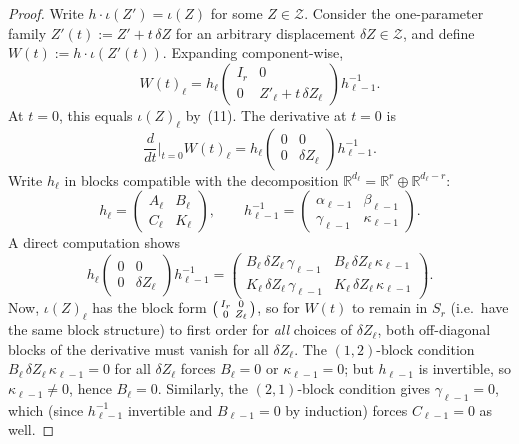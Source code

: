 \documentclass{article}
\theoremstyle{definition}
\begin{document}
\begin{proof}
Write $h \cdot \iota(Z') = \iota(Z)$ for some $Z \in \mathcal{Z}$. Consider the one-parameter family $Z'(t) := Z' + t\,\delta Z$ for an arbitrary displacement $\delta Z \in \mathcal{Z}$, and define $W(t) := h \cdot \iota(Z'(t))$.  Expanding component-wise,
\[
W(t)_\ell = h_\ell \begin{pmatrix} I_r & 0 \\ 0 & Z'_\ell + t\,\delta Z_\ell \end{pmatrix} h_{\ell-1}^{-1}.
\]
At $t = 0$, this equals $\iota(Z)_\ell$ by~(11).  The derivative at $t = 0$ is
\[
\frac{d}{dt}\Big|_{t=0} W(t)_\ell = h_\ell \begin{pmatrix} 0 & 0 \\ 0 & \delta Z_\ell \end{pmatrix} h_{\ell-1}^{-1}.
\]
Write $h_\ell$ in blocks compatible with the decomposition $\mathbb{R}^{d_\ell} = \mathbb{R}^r \oplus \mathbb{R}^{d_\ell - r}$:
\[
h_\ell = \begin{pmatrix} A_\ell & B_\ell \\ C_\ell & K_\ell \end{pmatrix}, \qquad
h_{\ell-1}^{-1} = \begin{pmatrix} \alpha_{\ell-1} & \beta_{\ell-1} \\ \gamma_{\ell-1} & \kappa_{\ell-1} \end{pmatrix}.
\]
A direct computation shows
\[
h_\ell \begin{pmatrix} 0 & 0 \\ 0 & \delta Z_\ell \end{pmatrix} h_{\ell-1}^{-1}
= \begin{pmatrix} B_\ell\, \delta Z_\ell\, \gamma_{\ell-1} & B_\ell\, \delta Z_\ell\, \kappa_{\ell-1} \\ K_\ell\, \delta Z_\ell\, \gamma_{\ell-1} & K_\ell\, \delta Z_\ell\, \kappa_{\ell-1} \end{pmatrix}.
\]
Now, $\iota(Z)_\ell$ has the block form $\begin{psmallmatrix} I_r & 0 \\ 0 & Z_\ell \end{psmallmatrix}$, so for $W(t)$ to remain in $S_r$ (i.e.\ have the same block structure) to first order for \emph{all} choices of $\delta Z_\ell$, both off-diagonal blocks of the derivative must vanish for all $\delta Z_\ell$.  The $(1,2)$-block condition $B_\ell\, \delta Z_\ell\, \kappa_{\ell-1} = 0$ for all $\delta Z_\ell$ forces $B_\ell = 0$ or $\kappa_{\ell-1} = 0$; but $h_{\ell-1}$ is invertible, so $\kappa_{\ell-1} \neq 0$, hence $B_\ell = 0$.  Similarly, the $(2,1)$-block condition gives $\gamma_{\ell-1} = 0$, which (since $h_{\ell-1}^{-1}$ invertible and $B_{\ell-1} = 0$ by induction) forces $C_{\ell-1} = 0$ as well.


\end{proof}
\end{document}
